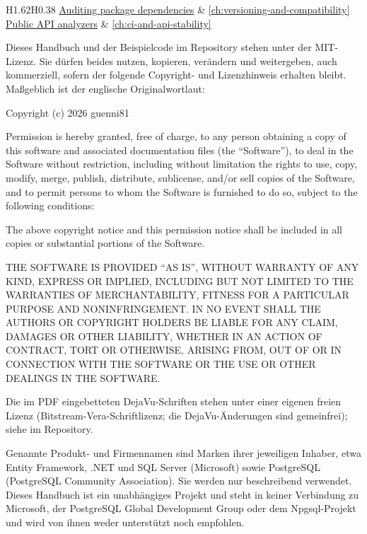 \begin{datatable}{H{1.62}H{0.38}}
  \tablerule
  \href{https://learn.microsoft.com/en-us/nuget/concepts/auditing-packages}{Auditing package dependencies} & \ref{ch:versioning-and-compatibility} \\
  \tablerule
  \href{https://github.com/dotnet/roslyn-analyzers/blob/main/src/PublicApiAnalyzers/PublicApiAnalyzers.Help.md}{Public API analyzers} & \ref{ch:ci-and-api-stability} \\
\end{datatable}


Dieses Handbuch und der Beispielcode im Repository stehen unter der MIT-Lizenz. Sie dürfen
beides nutzen, kopieren, verändern und weitergeben, auch kommerziell, sofern der folgende
Copyright- und Lizenzhinweis erhalten bleibt. Maßgeblich ist der englische Originalwortlaut:

Copyright (c) 2026 guenni81

Permission is hereby granted, free of charge, to any person obtaining a copy of this
software and associated documentation files (the “Software”), to deal in the Software
without restriction, including without limitation the rights to use, copy, modify, merge,
publish, distribute, sublicense, and/or sell copies of the Software, and to permit persons
to whom the Software is furnished to do so, subject to the following conditions:

The above copyright notice and this permission notice shall be included in all copies or
substantial portions of the Software.

THE SOFTWARE IS PROVIDED “AS IS”, WITHOUT WARRANTY OF ANY KIND, EXPRESS OR IMPLIED,
INCLUDING BUT NOT LIMITED TO THE WARRANTIES OF MERCHANTABILITY, FITNESS FOR A PARTICULAR
PURPOSE AND NONINFRINGEMENT. IN NO EVENT SHALL THE AUTHORS OR COPYRIGHT HOLDERS BE LIABLE
FOR ANY CLAIM, DAMAGES OR OTHER LIABILITY, WHETHER IN AN ACTION OF CONTRACT, TORT OR
OTHERWISE, ARISING FROM, OUT OF OR IN CONNECTION WITH THE SOFTWARE OR THE USE OR OTHER
DEALINGS IN THE SOFTWARE.

Die im PDF eingebetteten DejaVu-Schriften stehen unter einer eigenen freien Lizenz
(Bitstream-Vera-Schriftlizenz; die DejaVu-Änderungen sind gemeinfrei); siehe
im Repository.

Genannte Produkt- und Firmennamen sind Marken ihrer jeweiligen Inhaber, etwa Entity
Framework, .NET und SQL Server (Microsoft) sowie PostgreSQL (PostgreSQL Community
Association). Sie werden nur beschreibend verwendet. Dieses Handbuch ist ein unabhängiges
Projekt und steht in keiner Verbindung zu Microsoft, der PostgreSQL Global Development Group
oder dem Npgsql-Projekt und wird von ihnen weder unterstützt noch empfohlen.

